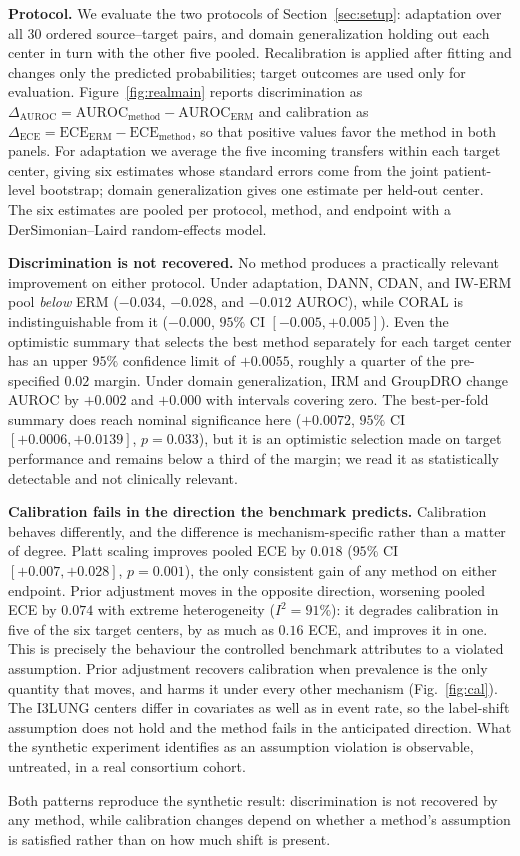 \textbf{Protocol.}
We evaluate the two protocols of Section~\ref{sec:setup}: adaptation over all
$30$ ordered source--target pairs, and domain generalization holding out each
center in turn with the other five pooled. Recalibration is applied after
fitting and changes only the predicted probabilities; target outcomes are used
only for evaluation. Figure~\ref{fig:realmain} reports discrimination as
$\Delta_{\mathrm{AUROC}}=\mathrm{AUROC}_{\mathrm{method}}-\mathrm{AUROC}_{\mathrm{ERM}}$
and calibration as
$\Delta_{\mathrm{ECE}}=\mathrm{ECE}_{\mathrm{ERM}}-\mathrm{ECE}_{\mathrm{method}}$,
so that positive values favor the method in both panels. For adaptation we
average the five incoming transfers within each target center, giving six
estimates whose standard errors come from the joint patient-level bootstrap;
domain generalization gives one estimate per held-out center. The six estimates
are pooled per protocol, method, and endpoint with a DerSimonian--Laird
random-effects model.

\textbf{Discrimination is not recovered.}
No method produces a practically relevant improvement on either protocol. Under
adaptation, DANN, CDAN, and IW-ERM pool \emph{below} ERM ($-0.034$, $-0.028$,
and $-0.012$ AUROC), while CORAL is indistinguishable from it ($-0.000$, $95\%$
CI $[-0.005,+0.005]$). Even the optimistic summary that selects the best method
separately for each target center has an upper $95\%$ confidence limit of
$+0.0055$, roughly a quarter of the pre-specified $0.02$ margin. Under domain
generalization, IRM and GroupDRO change AUROC by $+0.002$ and $+0.000$ with
intervals covering zero. The best-per-fold summary does reach nominal
significance here ($+0.0072$, $95\%$ CI $[+0.0006,+0.0139]$, $p=0.033$), but it
is an optimistic selection made on target performance and remains below a third
of the margin; we read it as statistically detectable and not clinically
relevant.

\textbf{Calibration fails in the direction the benchmark predicts.}
Calibration behaves differently, and the difference is mechanism-specific rather
than a matter of degree. Platt scaling improves pooled ECE by $0.018$ ($95\%$ CI
$[+0.007,+0.028]$, $p=0.001$), the only consistent gain of any method on either
endpoint. Prior adjustment moves in the opposite direction, worsening pooled ECE
by $0.074$ with extreme heterogeneity ($I^2=91\%$): it degrades calibration in
five of the six target centers, by as much as $0.16$ ECE, and improves it in
one. This is precisely the behaviour the controlled benchmark attributes to a
violated assumption. Prior adjustment recovers calibration when prevalence is
the only quantity that moves, and harms it under every other mechanism
(Fig.~\ref{fig:cal}). The I3LUNG centers differ in covariates as well as in
event rate, so the label-shift assumption does not hold and the method fails in
the anticipated direction. What the synthetic experiment identifies as an
assumption violation is observable, untreated, in a real consortium cohort.

Both patterns reproduce the synthetic result: discrimination is not recovered by
any method, while calibration changes depend on whether a method's assumption is
satisfied rather than on how much shift is present.
